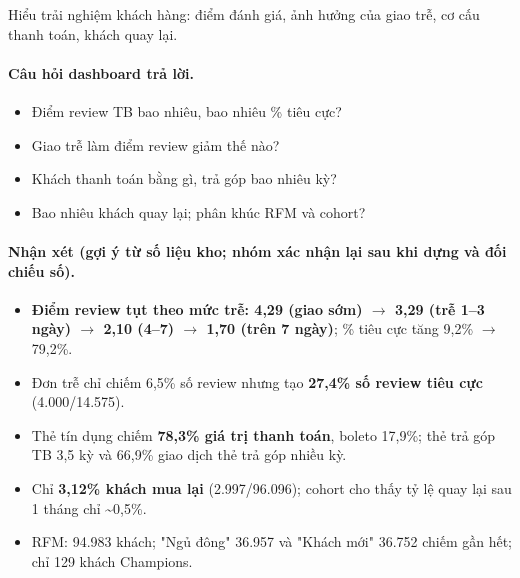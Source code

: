 Hiểu trải nghiệm khách hàng: điểm đánh giá, ảnh hưởng của giao trễ, cơ cấu thanh toán, khách quay lại.

\paragraph{Câu hỏi dashboard trả lời.}

\begin{itemize}
  \item Điểm review TB bao nhiêu, bao nhiêu \% tiêu cực?
  \item Giao trễ làm điểm review giảm thế nào?
  \item Khách thanh toán bằng gì, trả góp bao nhiêu kỳ?
  \item Bao nhiêu khách quay lại; phân khúc RFM và cohort?
\end{itemize}



\paragraph{Nhận xét (gợi ý từ số liệu kho; \textbf{nhóm xác nhận lại sau khi dựng và đối chiếu số}).}

\begin{itemize}
  \item \textbf{Điểm review tụt theo mức trễ: 4,29 (giao sớm) $\rightarrow$ 3,29 (trễ 1–3 ngày) $\rightarrow$ 2,10 (4–7) $\rightarrow$ 1,70 (trên 7 ngày)}; \% tiêu cực tăng 9,2\% $\rightarrow$ 79,2\%.
  \item Đơn trễ chỉ chiếm 6,5\% số review nhưng tạo \textbf{27,4\% số review tiêu cực} (4.000/14.575).
  \item Thẻ tín dụng chiếm \textbf{78,3\% giá trị thanh toán}, boleto 17,9\%; thẻ trả góp TB 3,5 kỳ và 66,9\% giao dịch thẻ trả góp nhiều kỳ.
  \item Chỉ \textbf{3,12\% khách mua lại} (2.997/96.096); cohort cho thấy tỷ lệ quay lại sau 1 tháng chỉ \textasciitilde{}0,5\%.
  \item RFM: 94.983 khách; "Ngủ đông" 36.957 và "Khách mới" 36.752 chiếm gần hết; chỉ 129 khách Champions.
\end{itemize}

